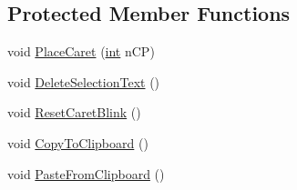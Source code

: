 \subsection*{Protected Member Functions}
\begin{DoxyCompactItemize}
\item 
void \hyperlink{class_c_d_x_u_t_edit_box_a2719e73a4549625b2f08bacea7abf270}{PlaceCaret} (\hyperlink{_d_x_u_tgui_8cpp_a2d77ed03302b6978834ee3b6f57837fb}{int} nCP)
\item 
void \hyperlink{class_c_d_x_u_t_edit_box_a706a8b318a003975afc8db51ec233d70}{DeleteSelectionText} ()
\item 
void \hyperlink{class_c_d_x_u_t_edit_box_af04922715d7f262b0e21a98e969f6e9c}{ResetCaretBlink} ()
\item 
void \hyperlink{class_c_d_x_u_t_edit_box_aebc41325d7ea210942b6c96c9df6d89e}{CopyToClipboard} ()
\item 
void \hyperlink{class_c_d_x_u_t_edit_box_ace90835de5f93d652b474f0b6e16ba9b}{PasteFromClipboard} ()
\end{DoxyCompactItemize}

